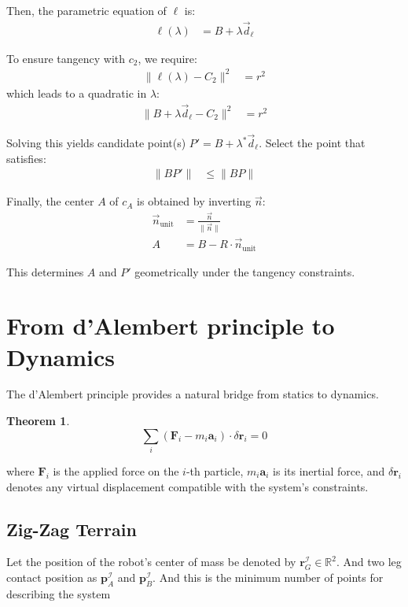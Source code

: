\documentclass[11pt]{article}
\newtheorem{theorem}[statement]{Theorem}
\begin{document}
Then, the parametric equation of $\ell$ is:
\begin{align*}
    \ell(\lambda) &= B + \lambda \vec{d}_\ell
\end{align*}

To ensure tangency with $c_2$, we require:
\begin{align*}
    \|\ell(\lambda) - C_2\|^2 &= r^2
\end{align*}
which leads to a quadratic in $\lambda$:
\begin{align*}
    \|B + \lambda \vec{d}_\ell - C_2\|^2 &= r^2
\end{align*}

Solving this yields candidate point(s) $P' = B + \lambda^* \vec{d}_\ell$.
Select the point that satisfies:
\begin{align*}
    \|BP'\| &\leq \|BP\|
\end{align*}

Finally, the center $A$ of $c_A$ is obtained by inverting $\vec{n}$:
\begin{align*}
    \vec{n}_{\text{unit}} &= \frac{\vec{n}}{\|\vec{n}\|} \\
    A &= B - R \cdot \vec{n}_{\text{unit}}
\end{align*}

This determines $A$ and $P'$ geometrically under the tangency constraints.

\section{From d'Alembert principle to Dynamics}
The d'Alembert principle provides a natural bridge from statics to dynamics. 

\begin{theorem}\label{thm:ld'Alembert}
    \[
    \sum_i \left( \mathbf{F}_i - m_i \mathbf{a}_i \right) \cdot \delta \mathbf{r}_i = 0
    \]
\end{theorem}

where $\mathbf{F}_i$ is the applied force on the $i$-th particle, $m_i \mathbf{a}_i$ is its inertial force, and $\delta \mathbf{r}_i$ denotes any virtual displacement compatible with the system's constraints.

\subsection{Zig-Zag Terrain}
Let the position of the robot's center of mass be denoted by \( \mathbf{r}_G^\mathcal{I} \in \mathbb{R}^2 \). And two leg contact position
as \( \mathbf{p}_A^\mathcal{I} \)  and \( \mathbf{p}_B^\mathcal{I} \). And this is the minimum number of points for describing the system 
\end{document}
